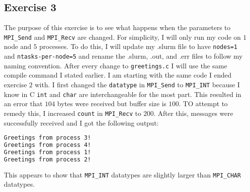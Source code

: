 \documentclass[11pt]{article}
\begin{document}
	
	
	\pagebreak
	\subsection{Exercise 3}
	The purpose of this exercise is to see what happens when the parameters to \texttt{MPI\_Send} and \texttt{MPI\_Recv} are changed. For simplicity, I will only run my code on $1$ node and $5$ processes. To do this, I will update my .slurm file to have \texttt{nodes=1} and \texttt{ntasks-per-node=5} and rename the .slurm, .out, and .err files to follow my naming convention. After every change to \texttt{greetings.c} I will use the same compile command I stated earlier.
	I am starting with the same code I ended exercise $2$ with. I first changed the \texttt{datatype} in \texttt{MPI\_Send} to \texttt{MPI\_INT} because I know in C \texttt{int} and \texttt{char} are interchangeable for the most part. This resulted in an error that $104$ bytes were received but buffer size is $100$. TO attempt to remedy this, I increased \texttt{count} in \texttt{MPI\_Recv} to $200$. After this, messages were successfully received and I got the following output:
	\begin{lstlisting}[language=bash]
Greetings from process 3!
Greetings from process 4!
Greetings from process 1!
Greetings from process 2!
	\end{lstlisting}
	This appears to show that \texttt{MPI\_INT} datatypes are slightly larger than \texttt{MPI\_CHAR} datatypes.
	
\end{document}
